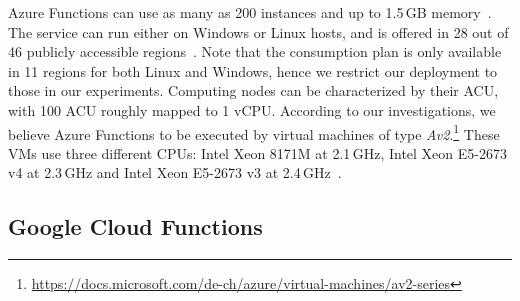 Azure Functions can use as many as 200 instances and up to 1.5\,\gls{GB} memory~\cite{AzureFunctionsPlans}. 
The service can run either on Windows or Linux hosts, and is offered in 28 out of 46 publicly accessible regions~\cite{AzureRegions}.
Note that the consumption plan is only available in 11 regions for both Linux and Windows, hence we restrict our deployment to those in our experiments.
Computing nodes can be characterized by their \gls{ACU}, with 100 ACU roughly mapped to 1 \gls{vCPU}.
According to our investigations, we believe Azure Functions to be executed by virtual machines of type \textit{Av2}.\footnote{\url{https://docs.microsoft.com/de-ch/azure/virtual-machines/av2-series}}
These \gls{VM}s use three different \gls{CPU}s: Intel Xeon 8171M at 2.1\,\gls{GHz}, Intel Xeon E5-2673 v4 at 2.3\,\gls{GHz} and Intel Xeon E5-2673 v3 at 2.4\,\gls{GHz}~\cite{AzureFunctionsVMs}.


\subsection{Google Cloud Functions}
\label{sec:ss:google}

